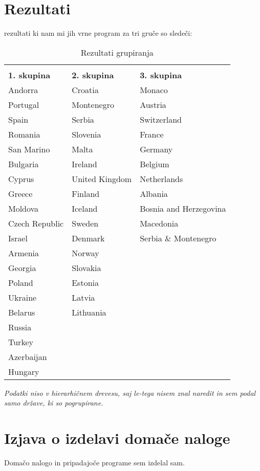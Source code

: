 \documentclass[a4paper,11pt]{article}
\begin{document}
\section{Rezultati}

rezultati ki nam mi jih vrne program za tri gruče so sledeči:

\begin{table}[]
\centering
\caption{Rezultati grupiranja}
\label{my-label}
\begin{tabular}{lll}\\\\
\textbf{1. skupina} & \textbf{2. skupina} & \textbf{3. skupina}    \\
Andorra             & Croatia             & Monaco                 \\
Portugal            & Montenegro          & Austria                \\
Spain               & Serbia              & Switzerland            \\
Romania             & Slovenia            & France                 \\
San Marino          & Malta               & Germany                \\
Bulgaria            & Ireland             & Belgium                \\
Cyprus              & United Kingdom      & Netherlands            \\
Greece              & Finland             & Albania                \\
Moldova             & Iceland             & Bosnia and Herzegovina \\
Czech Republic      & Sweden              & Macedonia              \\
Israel              & Denmark             & Serbia \& Montenegro   \\
Armenia             & Norway              &                        \\
Georgia             & Slovakia            &                        \\
Poland              & Estonia             &                        \\
Ukraine             & Latvia              &                        \\
Belarus             & Lithuania           &                        \\
Russia              &                     &                        \\
Turkey              &                     &                        \\
Azerbaijan          &                     &                        \\
Hungary             &                     &                       
\end{tabular}
\end{table}

\textit{Podatki niso v hierarhičnem drevesu, saj le-tega nisem znal naredit in sem podal samo države, ki so pogrupirane.}

\section{Izjava o izdelavi domače naloge}
Domačo nalogo in pripadajoče programe sem izdelal sam.
\end{document}
